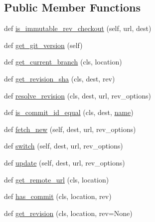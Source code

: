 \subsection*{Public Member Functions}
\begin{DoxyCompactItemize}
\item 
def \hyperlink{classpip_1_1__internal_1_1vcs_1_1git_1_1Git_abdb5a1f30c6ffae3c0b914183ef8d1ad}{is\+\_\+immutable\+\_\+rev\+\_\+checkout} (self, url, dest)
\item 
def \hyperlink{classpip_1_1__internal_1_1vcs_1_1git_1_1Git_ad237bd25668f1d0169ed3f5c1ddb7363}{get\+\_\+git\+\_\+version} (self)
\item 
def \hyperlink{classpip_1_1__internal_1_1vcs_1_1git_1_1Git_a6896a2a1e362867babff94b91aac356b}{get\+\_\+current\+\_\+branch} (cls, location)
\item 
def \hyperlink{classpip_1_1__internal_1_1vcs_1_1git_1_1Git_a8b2d6bd99548e4ebd47035d9066c488b}{get\+\_\+revision\+\_\+sha} (cls, dest, rev)
\item 
def \hyperlink{classpip_1_1__internal_1_1vcs_1_1git_1_1Git_a85b6fa33df082d3943a53f5507df3bb2}{resolve\+\_\+revision} (cls, dest, url, rev\+\_\+options)
\item 
def \hyperlink{classpip_1_1__internal_1_1vcs_1_1git_1_1Git_af33075c24ef8cd2d43d81938b8584a79}{is\+\_\+commit\+\_\+id\+\_\+equal} (cls, dest, \hyperlink{classpip_1_1__internal_1_1vcs_1_1git_1_1Git_a69e2d93063874505215fada01ac80b68}{name})
\item 
def \hyperlink{classpip_1_1__internal_1_1vcs_1_1git_1_1Git_a9fd6ec2415b1ac9910e80bdb61b91ec5}{fetch\+\_\+new} (self, dest, url, rev\+\_\+options)
\item 
def \hyperlink{classpip_1_1__internal_1_1vcs_1_1git_1_1Git_a1816a618d6e7254c4588e3c9be3a60a2}{switch} (self, dest, url, rev\+\_\+options)
\item 
def \hyperlink{classpip_1_1__internal_1_1vcs_1_1git_1_1Git_aa5158c33dc4a263752d57a944939e196}{update} (self, dest, url, rev\+\_\+options)
\item 
def \hyperlink{classpip_1_1__internal_1_1vcs_1_1git_1_1Git_aa3a873cb459126b2c2ff6af3b481ae01}{get\+\_\+remote\+\_\+url} (cls, location)
\item 
def \hyperlink{classpip_1_1__internal_1_1vcs_1_1git_1_1Git_aca80e2221a4dd6270232c1551c83904f}{has\+\_\+commit} (cls, location, rev)
\item 
def \hyperlink{classpip_1_1__internal_1_1vcs_1_1git_1_1Git_a8d0a21c308892ce38a2f18d15c28927c}{get\+\_\+revision} (cls, location, rev=None)

\end{DoxyCompactItemize}
